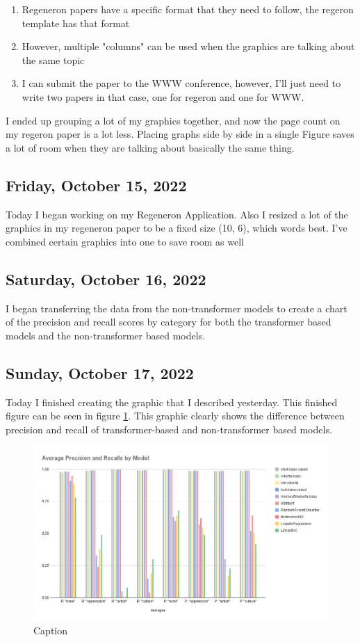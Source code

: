 \documentclass[11pt,letterpaper]{article}
\begin{document}
\begin{enumerate}
    \item Regeneron papers have a specific format that they need to follow, the regeron template has that format
    \item However, multiple "columns" can be used when the graphics are talking about the same topic
    \item I can submit the paper to the WWW conference, however, I'll just need to write two papers in that case, one for regeron and one for WWW.
\end{enumerate}

I ended up grouping a lot of my graphics together, and now the page count on my regeron paper is a lot less. Placing graphs side by side in a single Figure saves a lot of room when they are talking about basically the same thing.

\subsection{Friday, October 15, 2022}
Today I began working on my Regeneron Application. Also I resized a lot of the graphics in my regeneron paper to be a fixed size (10, 6), which words best. I've combined certain graphics into one to save room as well

\subsection{Saturday, October 16, 2022}
I began transferring the data from the non-transformer models to create a chart of the precision and recall scores by category for both the transformer based models and the non-transformer based models.

\subsection{Sunday, October 17, 2022}
Today I finished creating the graphic that I described yesterday. This finished figure can be seen in figure \ref{fig:including_non_trans}. This graphic clearly shows the difference between precision and recall of transformer-based and non-transformer based models.

\begin{figure}
    \centering
    \includegraphics[scale=0.4]{images/including_non_trans.png}
    \caption{Caption}
    \label{fig:including_non_trans}
\end{figure}
\end{document}
